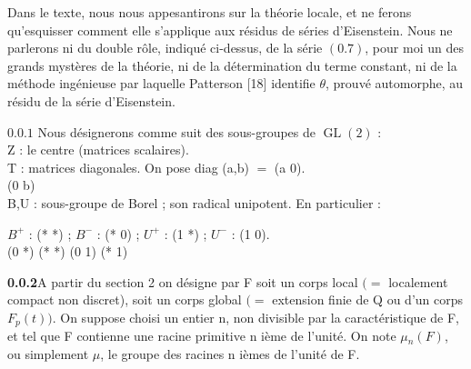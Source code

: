 \documentclass[10pt,a4paper]{article}
\begin{document}
\par Dans le texte, nous nous appesantirons sur la théorie locale, et ne ferons qu'esquisser comment elle s'applique aux résidus de séries d'Eisenstein. Nous ne parlerons ni du double rôle, indiqué ci-dessus, de la série $(0.7)$, pour moi un des grands mystères de la théorie, ni de la détermination du terme constant, ni de la méthode ingénieuse par laquelle Patterson [18] identifie $\theta{}$, prouvé automorphe, au résidu de la série d'Eisenstein.\par

\clearpage
{}
\label{d035-physical-008}
\par\medskip{}\par\smallskip
\par\smallskip\begin{center}\begin{minipage}{0.96\textwidth}\centering
$0.0.1$ Nous désignerons comme suit des sous-groupes de $\operatorname{GL}(2)$ : \\ Z : le centre (matrices scalaires). \\ T : matrices diagonales. On pose diag (a,b) $=$ (a 0). \\ (0 b) \\ B,U : sous-groupe de Borel ; son radical unipotent. En particulier :
\end{minipage}\end{center}\smallskip
\par\smallskip\begin{center}\begin{minipage}{0.96\textwidth}\centering
$B^+$ : (* *) ; $B^-$ : (* 0) ; $U^+$ : (1 *) ; $U^-$ : (1 0). \\ (0 *) (* *) (0 1) (* 1)
\end{minipage}\end{center}\smallskip
\par\noindent\textbf{0.0.2}\quad A partir du section 2 on désigne par F soit un corps local $(=$ localement compact non discret), soit un corps global $(=$ extension finie de Q ou d'un corps $F_p(t))$. On suppose choisi un entier n, non divisible par la caractéristique de F, et tel que F contienne une racine primitive n ième de l'unité. On note $\mu{}_n(F)$, ou simplement $\mu{}$, le groupe des racines n ièmes de l'unité de F.\par
\end{document}
